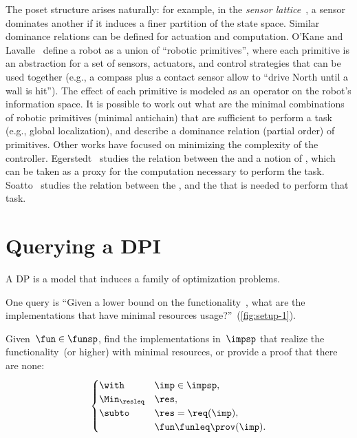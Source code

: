 The poset structure arises naturally: for example, in the \emph{sensor
lattice}~\cite{lavalle12sensing}, a sensor dominates another
if it induces a finer partition of the state space. Similar dominance
relations can be defined for actuation and computation. O'Kane and
Lavalle~\cite{okane08comparing} define a robot as a union of ``robotic
primitives'', where each primitive is an abstraction for a set of
sensors, actuators, and control strategies that can be used together
(e.g., a compass plus a contact sensor allow to ``drive North until
a wall is hit''). The effect of each primitive is modeled as an operator
on the robot's information space. It is possible to work out what
are the minimal combinations of robotic primitives (minimal antichain)
that are sufficient to perform a task (e.g., global localization),
and describe a dominance relation (partial order) of primitives. Other
works have focused on minimizing the complexity of the controller.
Egerstedt~\cite{egerstedt03motion} studies the relation between
the  and a notion of , which can be taken as
a proxy for the computation necessary to perform the task. Soatto~\cite{soatto11steps}
studies the relation between the ,
and the  that is needed to perform that
task.



\begin{example}
\end{example}

\section{Querying a DPI}

A DP is a model that induces a family of optimization problems.


One query is
``Given a lower bound on the functionality~\fun, what
are the implementations that have minimal resources usage?''~(\cref{fig:setup-1}).

\begin{problem}[FixFunMinReq]
  \label{prob:problem1}Given~$\fun\in\funsp$, find the implementations
  in~$\impsp$ that realize the functionality~\fun (or higher)
  with minimal resources, or provide a proof that there are none:
  \begin{equation}
    \begin{cases}
      \with & \imp\in\impsp,\\
      \Min_{\resleq} & \res,\\
      \subto & \res=\req(\imp),\\
      & \fun\funleq\prov(\imp).
    \end{cases}\label{eq:objective}
  \end{equation}
\end{problem}


